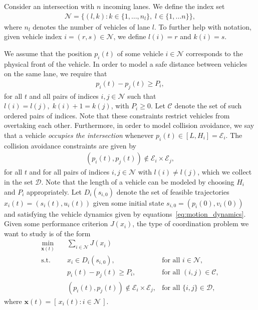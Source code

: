 \documentclass[a4paper]{article}
\theoremstyle{definition}
\theoremstyle{plain}
\begin{document}
Consider an intersection with $n$ incoming lanes. We define the index set
\begin{align*}
  \mathcal{N} = \{ (l, k) : k \in \{1, \dots, n_{l}\}, \; l \in \{1, \dots n\}\} ,
\end{align*}
where $n_{l}$ denotes the number of vehicles of lane $l$. To
further help with notation, given vehicle index $i = (r,s) \in \mathcal{N}$, we
define $l(i) = r$ and $k(i) = s$.

We assume that the position $p_{i}(t)$ of some vehicle $i \in \mathcal{N}$
corresponds to the physical front of the vehicle.
%
In order to model a safe distance between vehicles on the same lane, we require
that
\begin{align*}
  p_{i}(t) - p_{j}(t) \geq P_{i} ,
\end{align*}
for all $t$ and all pairs of indices $i, j \in \mathcal{N}$ such that
$l(i) = l(j), \; k(i) + 1 = k(j)$, with $P_{i} \geq 0$. Let $\mathcal{C}$ denote
the set of such ordered pairs of indices. Note that these constraints restrict
vehicles from overtaking each other.
%
Furthermore, in order to model collision avoidance, we say that a vehicle \textit{occupies the intersection}
whenever $p_{i}(t) \in [L, H_{i}] = \mathcal{E}_{i}$. The collision avoidance constraints are
given by
\begin{align*}
  (p_{i}(t), p_{j}(t)) \notin \mathcal{E}_{i} \times \mathcal{E}_{j},
\end{align*}
for all $t$ and for all pairs of indices $i, j \in \mathcal{N}$ with
$l(i) \neq l(j)$, which we collect in the set $\mathcal{D}$. Note that the length
of a vehicle can be modeled by choosing $H_{i}$ and $P_{i}$ appropriately.
%
Let $D_{i}(s_{i,0})$ denote the set of feasible trajectories
$x_{i}(t) = (s_{i}(t), u_{i}(t))$ given some initial state
$s_{i,0} = (p_{i}(0), v_{i}(0))$ and satisfying the vehicle dynamics given by
equations~\eqref{eq:motion_dynamics}. Given some performance criterion
$J(x_{i})$, the type of coordination problem we want to study is of the form
\begin{subequations}\label{eq:full_problem}
\begin{align}
  \min_{\mathbf{x}(t)} \quad & \sum_{i \in \mathcal{N}} J(x_{i}) \\
  \text{s.t.} \quad  & x_{i} \in D_{i}(s_{i,0}) , &\text{for all } i \in \mathcal{N} , \\
                & p_{i}(t) - p_{j}(t) \geq P_{i}, &\text{for all } (i,j) \in \mathcal{C} , \label{eq:follow_constraints} \\
                & (p_{i}(t), p_{j}(t))  \notin \mathcal{E}_{i} \times \mathcal{E}_{j} , &\text{for all } \{i,j\} \in \mathcal{D} \label{eq:collision_constraints} ,
\end{align}
\end{subequations}
where $\mathbf{x}(t) = [\, x_{i}(t) : i \in \mathcal{N} \,]$.
\end{document}
